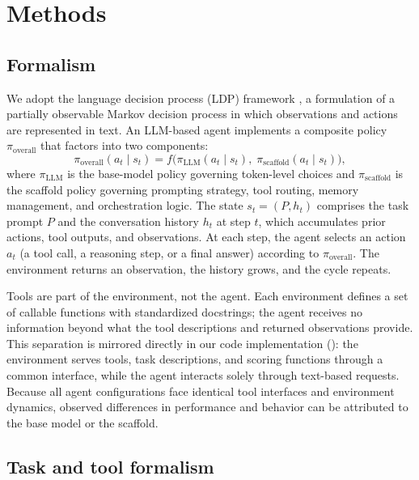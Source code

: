 \newpage
\section{Methods}

\subsection{Formalism}
\label{sec:formalism}

We adopt the language decision process (LDP) framework \autocite{narayanan2024aviary0,carta2023grounding}, a formulation of a partially observable Markov decision process in which observations and actions are represented in text. 
An LLM-based agent implements a composite policy $\pi_{\text{overall}}$ that factors into two components:
\begin{equation}
    \pi_{\text{overall}}(a_t \mid s_t) = f\bigl(\pi_{\text{LLM}}(a_t \mid s_t),\; \pi_{\text{scaffold}}(a_t \mid s_t)\bigr),
\end{equation}
where $\pi_{\text{LLM}}$ is the base-model policy governing token-level choices and $\pi_{\text{scaffold}}$ is the scaffold policy governing prompting strategy, tool routing, memory management, and orchestration logic. The state $s_t = (P, h_t)$ comprises the task prompt $P$ and the conversation history $h_t$ at step $t$, which accumulates prior actions, tool outputs, and observations. At each step, the agent selects an action $a_t$ (a tool call, a reasoning step, or a final answer) according to $\pi_{\text{overall}}$. The environment returns an observation, the history grows, and the cycle repeats.

Tools are part of the environment, not the agent. Each environment defines a set of callable functions with standardized docstrings; the agent receives no information beyond what the tool descriptions and returned observations provide. This separation is mirrored directly in our code implementation (): the environment serves tools, task descriptions, and scoring functions through a common interface, while the agent interacts solely through text-based requests. Because all agent configurations face identical tool interfaces and environment dynamics, observed differences in performance and behavior can be attributed to the base model or the scaffold.

\subsection{Task and tool formalism}
\label{sec:task_subtask}

